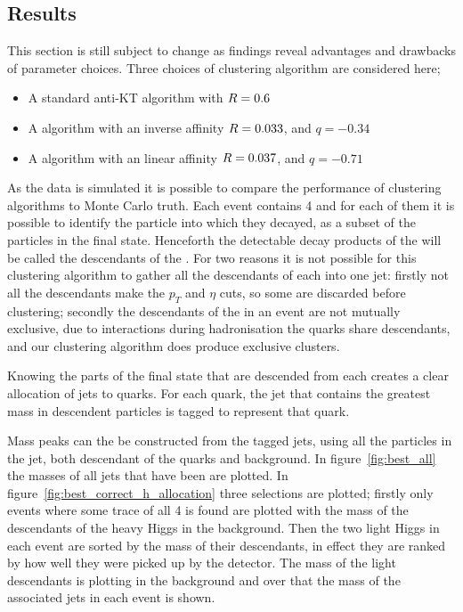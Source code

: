 \subsection{Results}
This section is still subject to change as findings reveal advantages and drawbacks
of parameter choices.
Three choices of clustering algorithm are considered here;
\begin{itemize}
    \item A standard anti-KT algorithm with \(R{}=0.6\) %
    \item A \spectralmeanjet{} algorithm with an inverse affinity \(R{}=0.033\), and \(q=-0.34\)
    \item A \spectralfulljet{} algorithm with an linear affinity \(R{}=0.037\), and \(q=-0.71\)
\end{itemize}

As the data is simulated it is possible to compare the performance of clustering algorithms to Monte Carlo truth.
Each event contains 4  and for each of them it is possible to identify the particle into which they decayed, as a subset of the particles in the final state.
Henceforth the detectable decay products of the  will be called the descendants of the .
For two reasons it is not possible for this clustering algorithm to gather all the descendants
of each  into one jet:
firstly not all the descendants make the \(p_T\) and \(\eta\) cuts, so some are discarded  before clustering;
secondly the descendants of the  in an event are not mutually exclusive, due to interactions during hadronisation the quarks share descendants, and our clustering algorithm does produce exclusive clusters.

Knowing the parts of the final state that are descended from each  creates a clear
allocation of jets to quarks.
For each quark, the jet that contains the greatest mass in descendent particles is tagged to represent that quark.

Mass peaks can the be constructed from the tagged jets, using all the particles in the jet,
both descendant of the quarks and background.
In figure~\ref{fig:best_all} the masses of all jets that have been  are plotted.
In figure~\ref{fig:best_correct_h_allocation} three selections are plotted; firstly only events where some trace of all 4  is found
are plotted with the mass of the descendants of the heavy Higgs in the background.
Then the two light Higgs in each event are sorted by the mass of their descendants,
in effect they are ranked by how well they were picked up by the detector.
The mass of the light descendants is plotting in the background and over
that the mass of the associated jets in each event is shown.


